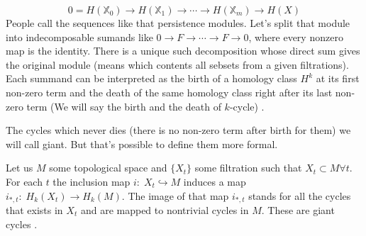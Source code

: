 \documentclass[a4paper, 12pt]{article}
\begin{document}
$$
	0 = H(\mathbb{X}_0) \to H(\mathbb{X}_1) \to \cdots \to H(\mathbb{X}_m) \to H(X)
$$
People call the sequences like that persistence modules. Let's split that module into indecomposable sumands like $0 \to F\to\cdots \to F \to 0$, where every nonzero map is the identity. There is a unique such decomposition whose direct sum gives the original module (means which contents all sebsets from a given filtrations). Each summand can be interpreted as the birth of a homology class $H^k$ at its first non-zero term and the death of the same homology class right after its last non-zero term (We will say the birth and the death of $k$-cycle) \cite{morozov}. 
\par The cycles which never dies (there is no non-zero term after birth for them) we will call giant. But that's possible to define them more formal. 
\par Let us $M$ some topological space and $\{X_t\}$ some filtration such that $X_t\subset M \forall t$. For each $t$ the inclusion map $i:\;X_t\hookrightarrow M$ induces a map $i_{*, t}:\; H_k(X_t)\to H_k(M)$. The image of that map $i_{*, t}$ stands for all the cycles that exists in $X_t$ and are mapped to nontrivial cycles in $M$. These are giant cycles \cite{bobprimoz}.
\end{document}
